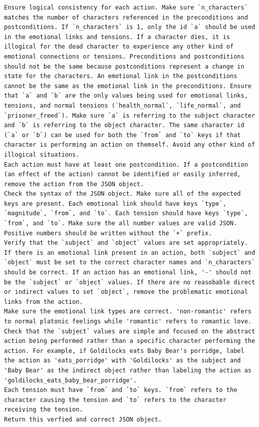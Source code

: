 \documentclass[phd,electronic,oneside,twosidetoc,letterpaper,chaptercenter,parttop,lof]{byumsphd}
\begin{document}
\begin{lstlisting}[style=mypromptstyle, caption={Verification}, label={lst:verify}]
Ensure logical consistency for each action. Make sure `n_characters` matches the number of characters referenced in the preconditions and postconditions. If `n_characters` is 1, only the id `a` should be used in the emotional links and tensions. If a character dies, it is illogical for the dead character to experience any other kind of emotional connections or tensions. Preconditions and postconditions should not be the same because postconditions represent a change in state for the characters. An emotional link in the postconditions cannot be the same as the emotional link in the preconditions. Ensure that `a` and `b` are the only values being used for emotional links, tensions, and normal tensions (`health_normal`, `life_normal`, and `prisoner_freed`). Make sure `a` is referring to the subject character and `b` is referring to the object character. The same character id (`a` or `b`) can be used for both the `from` and `to` keys if that character is performing an action on themself. Avoid any other kind of illogical situations. 
Each action must have at least one postcondition. If a postcondition (an effect of the action) cannot be identified or easily inferred, remove the action from the JSON object.
Check the syntax of the JSON object. Make sure all of the expected keys are present. Each emotional link should have keys `type`, `magnitude`, `from`, and `to`. Each tension should have keys `type`, `from`, and `to`. Make sure the all number values are valid JSON. Positive numbers should be written without the `+` prefix.
Verify that the `subject` and `object` values are set appropriately. If there is an emotional link present in an action, both `subject` and `object` must be set to the correct character names and `n_characters` should be correct. If an action has an emotional link, '-' should not be the `subject` or `object` values. If there are no reasobable direct or indirect values to set `object`, remove the problematic emotional links from the action.
Make sure the emotional link types are correct. 'non-romantic' refers to normal platonic feelings while 'romantic' refers to romantic love.
Check that the `subject` values are simple and focused on the abstract action being performed rather than a specific character performing the action. For example, if Goldilocks eats Baby Bear's porridge, label the action as 'eats_porridge' with 'Goldilocks' as the subject and 'Baby Bear' as the indirect object rather than labeling the action as 'goldilocks_eats_baby_bear_porridge'. 
Each tension must have `from` and `to` keys. `from` refers to the character causing the tension and `to` refers to the character receiving the tension.
Return this verfied and correct JSON object.

\end{lstlisting}
\end{document}
